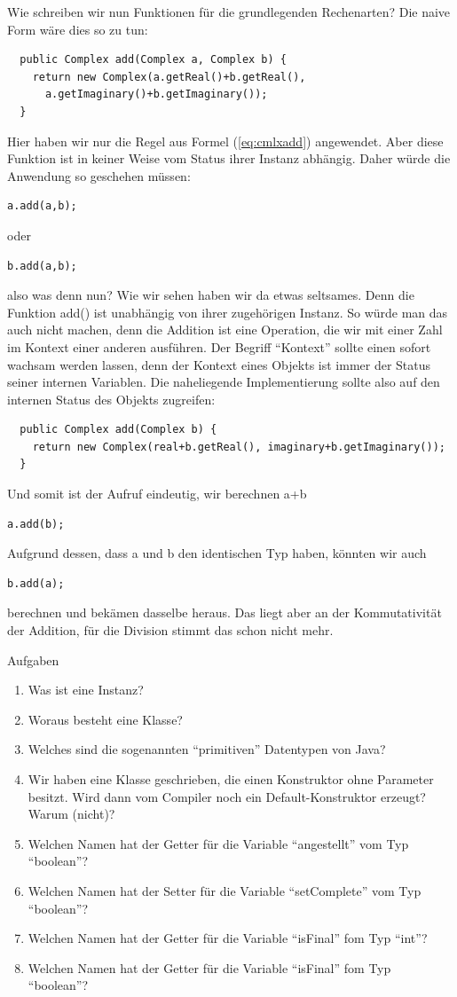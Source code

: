 Wie schreiben wir nun Funktionen für die grundlegenden Rechenarten? Die naive Form wäre dies so zu tun:
\begin{lstlisting}
  public Complex add(Complex a, Complex b) {
    return new Complex(a.getReal()+b.getReal(), 
      a.getImaginary()+b.getImaginary());
  }
\end{lstlisting}
Hier haben wir nur die Regel aus Formel (\ref{eq:cmlxadd}) angewendet. Aber diese Funktion ist in keiner Weise vom Status ihrer Instanz abhängig. Daher würde die Anwendung so geschehen müssen:
\begin{lstlisting}
a.add(a,b);
\end{lstlisting}
oder
\begin{lstlisting}
b.add(a,b);
\end{lstlisting}
also was denn nun? Wie wir sehen haben wir da etwas seltsames. Denn die Funktion add() ist unabhängig von ihrer zugehörigen Instanz. So würde man das auch nicht machen, denn die Addition ist eine Operation, die wir mit einer Zahl im Kontext einer anderen ausführen. Der Begriff "`Kontext"' sollte einen sofort wachsam werden lassen, denn der Kontext eines Objekts ist immer der Status seiner internen Variablen. Die naheliegende Implementierung sollte also auf den internen Status des Objekts zugreifen:
\begin{lstlisting}
  public Complex add(Complex b) {
    return new Complex(real+b.getReal(), imaginary+b.getImaginary());
  }
\end{lstlisting}
Und somit ist der Aufruf eindeutig, wir berechnen a+b
\begin{lstlisting}
a.add(b);
\end{lstlisting}
Aufgrund dessen, dass a und b den identischen Typ haben, könnten wir auch 
\begin{lstlisting}
b.add(a);
\end{lstlisting}
berechnen und bekämen dasselbe heraus. Das liegt aber an der Kommutativität der Addition, für die Division stimmt das schon nicht mehr.

\begin{xcb}{Aufgaben}
\begin{enumerate}
\item Was ist eine Instanz?
\item Woraus besteht eine Klasse?
\item Welches sind die sogenannten "`primitiven"' Datentypen von Java?
\item Wir haben eine Klasse geschrieben, die einen Konstruktor ohne Parameter besitzt. Wird dann vom Compiler noch ein Default-Konstruktor erzeugt? Warum (nicht)?
\item Welchen Namen hat der Getter für die Variable "`angestellt"' vom Typ "`boolean"'?
\item Welchen Namen hat der Setter für die Variable "`setComplete"' vom Typ "`boolean"'?
\item Welchen Namen hat der Getter für die Variable "`isFinal"' fom Typ "`int"'?
\item Welchen Namen hat der Getter für die Variable "`isFinal"' fom Typ "`boolean"'?
\end{enumerate}
\end{xcb}

